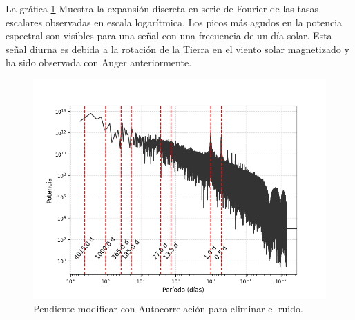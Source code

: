 La gráfica \ref{FFT} Muestra la expansión discreta en serie de Fourier de las tasas escalares observadas en escala logarítmica. Los picos más agudos en la potencia espectral son visibles para una señal con una frecuencia de un día solar. Esta señal diurna es debida a la rotación de la Tierra en el viento solar magnetizado y ha sido observada con Auger anteriormente.

\begin{figure}
\centering
\includegraphics[width=0.8\linewidth]{Figs/Figr/fft_period.png}
    \caption{Pendiente modificar con Autocorrelación para eliminar el ruido.}
    \label{FFT}
\end{figure}




